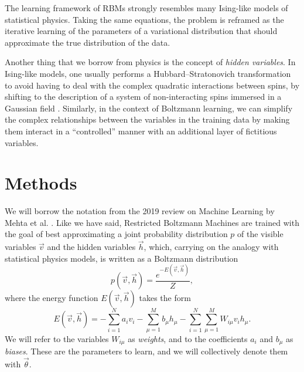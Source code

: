 \documentclass[prl, twocolumn]{revtex4-2}
\begin{document}
The learning framework of RBMs strongly resembles many Ising-like models of
statistical physics. Taking the same equations, the problem is reframed as
the iterative learning of the parameters of a variational distribution that
should approximate the true distribution of the data.

Another thing that we borrow from physics is the concept of \emph{hidden
variables}. In Ising-like models, one usually performs a
Hubbard–Stratonovich transformation to avoid having to deal with the
complex quadratic interactions between spins, by shifting to the
description of a system of non-interacting spins immersed in a Gaussian
field \cite{Hubbard1959}. Similarly, in the context of Boltzmann learning,
we can simplify the complex relationships between the variables in the
training data by making them interact in a “controlled” manner with an
additional layer of fictitious variables. 

\section{Methods}
We will borrow the notation from the 2019 review on Machine Learning by
Mehta et al. \cite{Mehta2019}. Like we have said, Restricted Boltzmann
Machines are trained with the goal of best approximating a joint
probability distribution $p$ of the visible variables $\vec{v}$ and the
hidden variables $\vec{h}$, which, carrying on the analogy with statistical
physics models, is written as a Boltzmann distribution
\begin{equation}
    p(\vec{v}, \vec{h}) = \frac{e^{-E(\vec{v}, \vec{h})}}{Z},
\end{equation}
where the energy function $E(\vec{v}, \vec{h})$ takes the form
\begin{equation}
    E(\vec{v}, \vec{h}) = - \sum_{i = 1}^{N} a_i v_i - \sum_{\mu = 1}^{M}
    b_\mu h_\mu - \sum_{i = 1}^{N} \sum_{\mu = 1}^{M} W_{i \mu} v_i h_\mu.
    \label{eq:hamiltonian}
\end{equation}
We will refer to the variables $W_{i\mu}$ as \emph{weights}, and to the
coefficients $a_i$ and $b_\mu$ as \emph{biases}. These are the parameters
to learn, and we will collectively denote them with $\vec{\theta}$.
\end{document}
